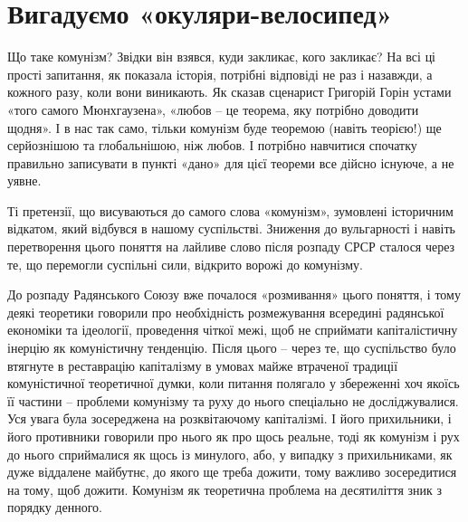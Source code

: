 \documentclass[../main]{subfiles}
\begin{document}
\ifSubfilesClassLoaded{\setcounter{page}{4}}{}
\section{Вигадуємо «окуляри-велосипед»}
\label{sec:01_izobretaem_ochki}

Що таке комунізм? Звідки він взявся, куди закликає, кого закликає? На всі ці прості запитання, як показала історія, потрібні відповіді не раз і назавжди, а кожного разу, коли вони виникають. Як сказав сценарист Григорій Горін устами «того самого Мюнхгаузена», «любов – це теорема, яку потрібно доводити щодня». І в нас так само, тільки комунізм буде теоремою (навіть теорією!) ще серйознішою та глобальнішою, ніж любов. І потрібно навчитися спочатку правильно записувати в пункті «дано» для цієї теореми все дійсно існуюче, а не уявне.

Ті претензії, що висуваються до самого слова «комунізм», зумовлені історичним відкатом, який відбувся в нашому суспільстві. Зниження до вульгарності і навіть перетворення цього поняття на лайливе слово після розпаду СРСР сталося через те, що перемогли суспільні сили, відкрито ворожі до комунізму.

До розпаду Радянського Союзу вже почалося «розмивання» цього поняття, і тому деякі теоретики говорили про необхідність розмежування всередині радянської економіки та ідеології, проведення чіткої межі, щоб не сприймати капіталістичну інерцію як комуністичну тенденцію. Після цього – через те, що суспільство було втягнуте в реставрацію капіталізму в умовах майже втраченої традиції комуністичної теоретичної думки, коли питання полягало у збереженні хоч якоїсь її частини – проблеми комунізму та руху до нього спеціально не досліджувалися. Уся увага була зосереджена на розквітаючому капіталізмі. І його прихильники, і його противники говорили про нього як про щось реальне, тоді як комунізм і рух до нього сприймалися як щось із минулого, або, у випадку з прихильниками, як дуже віддалене майбутнє, до якого ще треба дожити, тому важливо зосередитися на тому, щоб дожити. Комунізм як теоретична проблема на десятиліття зник з порядку денного.
\end{document}
